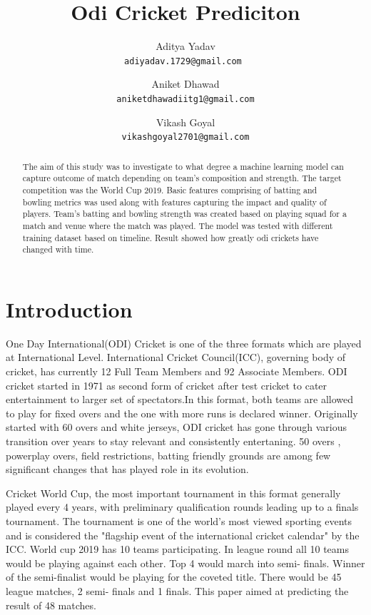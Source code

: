 \documentclass[a4paper]{article}
\title{Odi Cricket Prediciton}
\author{Aditya Yadav\\ 
\texttt{adiyadav.1729@gmail.com }\and
Aniket Dhawad\\
\texttt{aniketdhawadiitg1@gmail.com} \and
Vikash Goyal \\
\texttt{vikashgoyal2701@gmail.com}}
\begin{document}
\maketitle

\begin{abstract}
The aim of this study was to investigate to what degree a machine learning model can capture outcome of match depending on team's composition and strength. The target competition was the World Cup 2019.   Basic features comprising of batting and bowling metrics was used along with features capturing the impact and quality of players. Team's batting and bowling strength was created based on playing squad for a match and venue where the match was played. 
The model was tested with different training dataset based on timeline. Result showed how greatly odi crickets have changed with time. 
\end{abstract}

\section{Introduction}

One Day International(ODI) Cricket is one of the three formats which are played at International Level. International Cricket Council(ICC), governing body of cricket, has  currently 12  Full Team Members and 92 Associate Members. 
ODI cricket started in 1971 as second form of cricket after test cricket to cater entertainment to larger set of spectators.In this format, both teams are allowed to play for fixed overs and the one with more runs is declared winner. Originally started with 60 overs and white jerseys, ODI cricket has gone through various transition over years  
to stay relevant and consistently entertaning. 50 overs , powerplay overs, field restrictions, batting friendly grounds are among few significant changes that has played role in its evolution.

Cricket World Cup, the most important tournament in this format generally played every 4 years, with preliminary qualification rounds leading up to a finals tournament. The tournament is one of the world's most viewed sporting events and is considered the "flagship event of the international cricket calendar" by the ICC.  World cup 2019 has 10 teams participating. In league round all 10 teams would be playing against each other. Top 4 would march into semi- finals. Winner of the semi-finalist would be playing for the coveted title. There would be 45 league matches, 2 semi- finals and 1 finals. This paper aimed at predicting the result of 48 matches.
\end{document}
